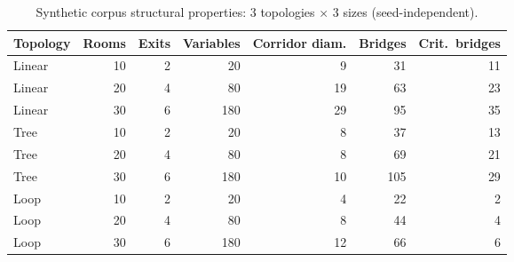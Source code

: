 \documentclass[11pt]{article}
\begin{document}
\begin{table}[h]
\centering
\caption{Synthetic corpus structural properties: 3 topologies $\times$ 3 sizes (seed-independent).}
\label{tab:appendixb}
\small
\begin{tabular}{lrrrrrr}
\toprule
Topology & Rooms & Exits & Variables & Corridor diam. & Bridges & Crit.\ bridges \\
\midrule
Linear & 10 & 2 & 20 & 9 & 31 & 11 \\
Linear & 20 & 4 & 80 & 19 & 63 & 23 \\
Linear & 30 & 6 & 180 & 29 & 95 & 35 \\
Tree & 10 & 2 & 20 & 8 & 37 & 13 \\
Tree & 20 & 4 & 80 & 8 & 69 & 21 \\
Tree & 30 & 6 & 180 & 10 & 105 & 29 \\
Loop & 10 & 2 & 20 & 4 & 22 & 2 \\
Loop & 20 & 4 & 80 & 8 & 44 & 4 \\
Loop & 30 & 6 & 180 & 12 & 66 & 6 \\
\bottomrule
\end{tabular}
\end{table}
\end{document}
